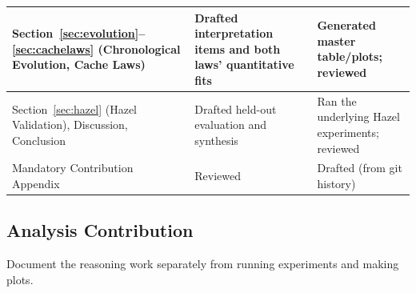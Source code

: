 \documentclass{article}
\begin{document}
\begin{longtable}{|p{5cm}|p{4.5cm}|p{4.5cm}|}
Section~\ref{sec:evolution}--\ref{sec:cachelaws} (Chronological Evolution, Cache Laws) & Drafted interpretation items and both laws' quantitative fits & Generated master table/plots; reviewed \\
\hline

Section~\ref{sec:hazel} (Hazel Validation), Discussion, Conclusion & Drafted held-out evaluation and synthesis & Ran the underlying Hazel experiments; reviewed \\
\hline

Mandatory Contribution Appendix & Reviewed & Drafted (from git history) \\
\hline

\end{longtable}


\subsection{Analysis Contribution}

Document the reasoning work separately from running experiments and making plots.
\end{document}
